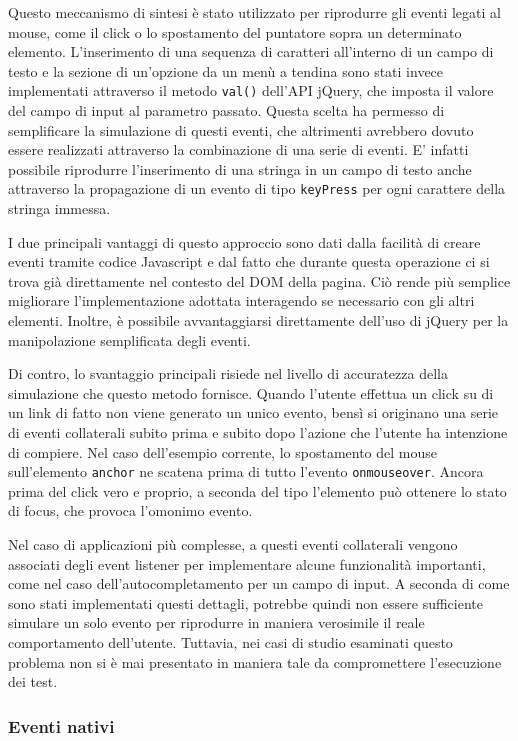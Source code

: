 Questo meccanismo di sintesi è stato utilizzato per riprodurre gli eventi legati al mouse, come il click o lo spostamento del puntatore sopra un determinato elemento. L'inserimento di una sequenza di caratteri all'interno di un campo di testo e la sezione di un'opzione da un menù a tendina sono stati invece implementati attraverso il metodo \verb|val()| dell'API jQuery, che imposta il valore del campo di input al parametro passato. Questa scelta ha permesso di semplificare la simulazione di questi eventi, che altrimenti avrebbero dovuto essere realizzati attraverso la combinazione di una serie di eventi. E' infatti possibile riprodurre l'inserimento di una stringa in un campo di testo anche attraverso la propagazione di un evento di tipo \verb|keyPress| per ogni carattere della stringa immessa.

I due principali vantaggi di questo approccio sono dati dalla facilità di creare eventi tramite codice Javascript e dal fatto che durante questa operazione ci si trova già direttamente nel contesto del DOM della pagina. Ciò rende più semplice migliorare l'implementazione adottata interagendo se necessario con gli altri elementi. Inoltre, è possibile avvantaggiarsi direttamente dell'uso di jQuery per la manipolazione semplificata degli eventi.

Di contro, lo svantaggio principali risiede nel livello di accuratezza della simulazione che questo metodo fornisce. Quando l'utente effettua un click su di un link di fatto non viene generato un unico evento, bensì si originano una serie di eventi collaterali subito prima e subito dopo l'azione che l'utente ha intenzione di compiere. Nel caso dell'esempio corrente, lo spostamento del mouse sull'elemento \verb|anchor| ne scatena prima di tutto l'evento \verb|onmouseover|. Ancora prima del click vero e proprio, a seconda del tipo l'elemento può ottenere lo stato di focus, che provoca l'omonimo evento.

Nel caso di applicazioni più complesse, a questi eventi collaterali vengono associati degli event listener per implementare alcune funzionalità importanti, come nel caso dell'autocompletamento per un campo di input. A seconda di come sono stati implementati questi dettagli, potrebbe quindi non essere sufficiente simulare un solo evento per riprodurre in maniera verosimile il reale comportamento dell'utente. Tuttavia, nei casi di studio esaminati questo problema non si è mai presentato in maniera tale da compromettere l'esecuzione dei test.

\subsubsection{Eventi nativi}

